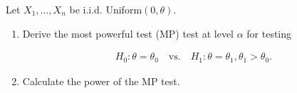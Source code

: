 
\begin{exercise}

Let $X_1,\dots,X_n$ be i.i.d. Uniform$(0,\theta)$.

\begin{enumerate}[label = (\alph*)]
    \item Derive the most powerful test (MP) test at level $\alpha$ for testing
    
    \begin{align*}
        H_0: \theta = \theta_0 \quad \text{vs.} \quad H_1: \theta = \theta_1, \theta_1 > \theta_0.
    \end{align*}
     \item Calculate the power of the MP test.
\end{enumerate}

\end{exercise}


